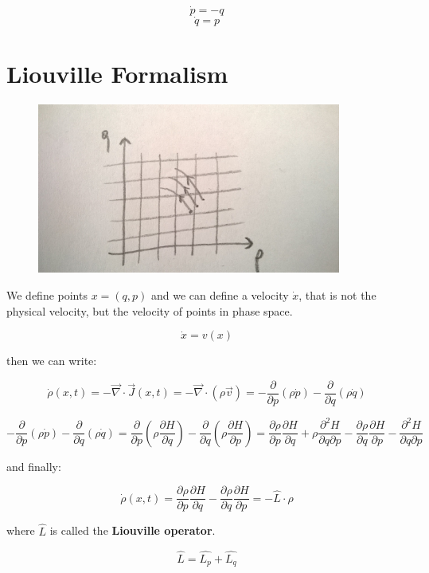 \documentclass[a4paper, italian, openany]{book}
\begin{document}
$$\dot{p} = -q$$
$$\dot{q} = p$$

\section{Liouville Formalism}

\begin{figure}[H]
\centering
\includegraphics[width=100mm]{img/pic2.jpg}
\end{figure}

We define points $x = (q, p)$ and we can define a velocity $\dot{x}$, that is not the physical velocity, but the velocity of points in phase space.

$$\dot{x} = v(x)$$

then we can write:

$$\dot{\rho}(x, t) = - \overrightarrow{\nabla} \cdot \overrightarrow{J} (x, t) = - \overrightarrow{\nabla} \cdot (\rho \overrightarrow{v} ) = -\frac{\partial}{\partial p} (\rho \dot{p}) - \frac{\partial}{\partial q}(\rho \dot{q})$$

$$-\frac{\partial}{\partial p} (\rho \dot{p}) - \frac{\partial}{\partial q}(\rho \dot{q}) =  \frac{\partial}{\partial p} \left ( \rho \frac{\partial H}{\partial q} \right ) -  \frac{\partial}{\partial q} \left ( \rho \frac{\partial H}{\partial p} \right ) = \frac{\partial \rho}{\partial p} \frac{\partial H}{\partial q} + \rho \frac{\partial^2 H}{\partial q \partial p} - \frac{\partial \rho}{\partial q} \frac{\partial H}{\partial p} - \frac{\partial^2 H}{\partial q \partial p}$$

and finally:

$$\dot{\rho}(x, t) = \frac{\partial \rho}{\partial p} \frac{\partial H}{\partial q} - \frac{\partial \rho}{\partial q} \frac{\partial H}{\partial p} = - \hat{L} \cdot \rho$$

where $\hat{L}$ is called the \textbf{Liouville operator}.

$$\hat{L} = \hat{L_p} + \hat{L_q}$$
\end{document}
